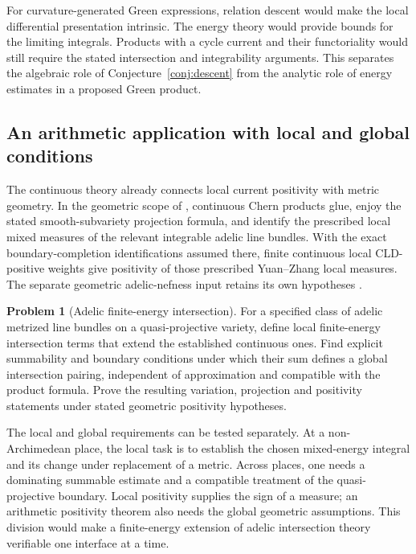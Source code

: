 \documentclass[11pt,a4paper]{article}
\newcommand{\Conjref}[1]{Conjecture~\ref{#1}}
\theoremstyle{definition}
\newtheorem{problem}[theorem]{Problem}
\theoremstyle{remark}
\numberwithin{equation}{section}
\begin{document}
For curvature-generated Green expressions, relation descent would
make the local differential presentation intrinsic.  The energy
theory would provide bounds for the limiting integrals.  Products
with a cycle current and their functoriality would still require
the stated intersection and integrability arguments.  This separates
the algebraic role of \Conjref{conj:descent} from the analytic role
of energy estimates in a proposed Green product.

\subsection{An arithmetic application with local and global conditions}

The continuous theory already connects local current positivity with
metric geometry.  In the geometric scope of \cite{R}, continuous
Chern products glue, enjoy the stated smooth-subvariety projection
formula, and identify the prescribed local mixed measures of the
relevant integrable adelic line bundles.  With the exact
boundary-completion identifications assumed there, finite continuous
local CLD-positive weights give positivity of those prescribed
Yuan--Zhang local measures.  The separate geometric adelic-nefness
input retains its own hypotheses \cite{R,YZ}.

\begin{problem}[Adelic finite-energy intersection]
\label{problem:adelic}
For a specified class of adelic metrized line bundles on a
quasi-projective variety, define local finite-energy intersection
terms that extend the established continuous ones.  Find explicit
summability and boundary conditions under which their sum defines a
global intersection pairing, independent of approximation and
compatible with the product formula.  Prove the resulting variation,
projection and positivity statements under stated geometric
positivity hypotheses.
\end{problem}

The local and global requirements can be tested separately.  At a
non-Archimedean place, the local task is to establish the chosen
mixed-energy integral and its change under replacement of a metric.
Across places, one needs a dominating summable estimate and a
compatible treatment of the quasi-projective boundary.  Local
positivity supplies the sign of a measure; an arithmetic positivity
theorem also needs the global geometric assumptions.  This division
would make a finite-energy extension of adelic intersection theory
verifiable one interface at a time.
\end{document}
